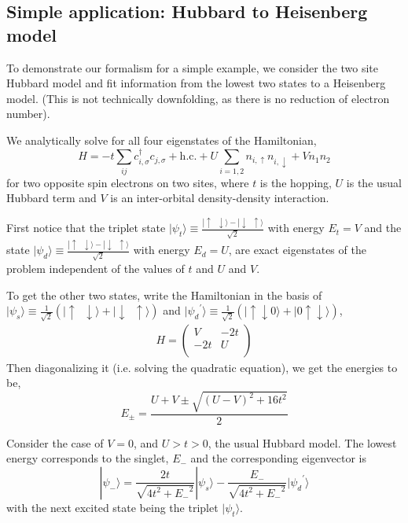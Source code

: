 \documentclass[aip,jcp,twocolumn,10pt]{revtex4-1}
\begin{document}
\subsection{Simple application: Hubbard to Heisenberg model}
To demonstrate our formalism for a simple example, we 
consider the two site Hubbard model and fit information from the lowest two states 
to a Heisenberg model. (This is not technically downfolding, as there is no reduction 
of electron number). 

We analytically solve for all four eigenstates of the Hamiltonian,
\begin{equation}
H = -t \sum_{ij} c_{i,\sigma}^{\dagger} c_{j,\sigma} + \text{h.c.} + U \sum_{i=1,2} n_{i,\uparrow} n_{i,\downarrow}+ V n_1 n_2
\label{eq:two_hubbard}
\end{equation}
for two opposite spin electrons on two sites, where $t$ is the hopping, $U$ is the usual Hubbard term and $V$ is an inter-orbital density-density 
interaction. 
 
First notice that the triplet state $| \psi_t \rangle \equiv \frac{|\uparrow \;\; \downarrow \rangle - |\downarrow \;\; \uparrow \rangle }{\sqrt{2}} $ with energy $E_t=V$ and the state $|\psi_d \rangle \equiv \frac{|\uparrow \;\; \downarrow \rangle - |\downarrow \;\; \uparrow \rangle }{\sqrt{2}}$ with energy $E_d=U$, are exact eigenstates of the problem independent of the values of $t$ and $U$ and $V$. 

To get the other two states, write the Hamiltonian in the 
basis of $ |\psi_s \rangle \equiv \frac{1}{\sqrt{2}} \left( |\uparrow \;\; \downarrow \rangle + |\downarrow \;\; \uparrow \rangle \right) $ 
and $ | {\psi_d}^{'} \rangle \equiv \frac{1}{\sqrt{2}} \left( |\uparrow\downarrow 0 \rangle + |0 \uparrow\downarrow \rangle \right) $, 
\begin{eqnarray}
H =
\left(
\begin{array}{cc}
V   & -2t \\
-2t & U    \\
\end{array}
\right)
\end{eqnarray}
Then diagonalizing it (i.e. solving the quadratic equation), we get the energies to be, 
\begin{equation}
E_{\pm} = \frac{U + V \pm \sqrt{(U-V)^2+16 t^2} }{2}
\end{equation}

Consider the case of $V=0$, and $U>t>0$, the usual Hubbard model. 
The lowest energy corresponds to the singlet, $E_{-}$ and the 
corresponding eigenvector is 
\begin{equation}
	| \psi_{-} \rangle = \frac{2t}{\sqrt{4t^2+{E_{-}}^2}} |\psi_s \rangle  - \frac{E_{-}}{\sqrt{4t^2+{E_{-}}^2}} |{\psi_d}^{'} \rangle
\end{equation}
with the next excited state being the triplet $|\psi_t \rangle$.
\end{document}
